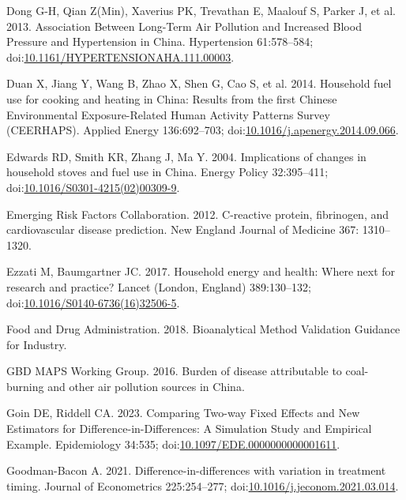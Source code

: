 \documentclass[
  letterpaper,
  DIV=11,
  numbers=noendperiod]{scrartcl}
\newlength{\cslhangindent}
\newenvironment{CSLReferences}[2] %
 {\begin{list}{}{%
  \setlength{\itemindent}{0pt}
  \setlength{\leftmargin}{0pt}
  \setlength{\parsep}{0pt}
  \ifodd #1
   \setlength{\leftmargin}{\cslhangindent}
   \setlength{\itemindent}{-1\cslhangindent}
  \fi
  \setlength{\itemsep}{#2\baselineskip}}}
 {\end{list}}
\begin{document}
\begin{CSLReferences}{1}{1}
Dong G-H, Qian Z(Min), Xaverius PK, Trevathan E, Maalouf S, Parker J, et
al. 2013. Association {Between Long-Term Air Pollution} and {Increased
Blood Pressure} and {Hypertension} in {China}. Hypertension 61:578--584;
doi:\href{https://doi.org/10.1161/HYPERTENSIONAHA.111.00003}{10.1161/HYPERTENSIONAHA.111.00003}.

Duan X, Jiang Y, Wang B, Zhao X, Shen G, Cao S, et al. 2014. Household
fuel use for cooking and heating in {China}: {Results} from the first
{Chinese Environmental Exposure-Related Human Activity Patterns Survey}
({CEERHAPS}). Applied Energy 136:692--703;
doi:\href{https://doi.org/10.1016/j.apenergy.2014.09.066}{10.1016/j.apenergy.2014.09.066}.

Edwards RD, Smith KR, Zhang J, Ma Y. 2004. Implications of changes in
household stoves and fuel use in {China}. Energy Policy 32:395--411;
doi:\href{https://doi.org/10.1016/S0301-4215(02)00309-9}{10.1016/S0301-4215(02)00309-9}.

Emerging Risk Factors Collaboration. 2012. C-reactive protein,
fibrinogen, and cardiovascular disease prediction. New England Journal
of Medicine 367: 1310--1320.

Ezzati M, Baumgartner JC. 2017. Household energy and health: Where next
for research and practice? Lancet (London, England) 389:130--132;
doi:\href{https://doi.org/10.1016/S0140-6736(16)32506-5}{10.1016/S0140-6736(16)32506-5}.

Food and Drug Administration. 2018. Bioanalytical {Method Validation
Guidance} for {Industry}.

GBD MAPS Working Group. 2016. Burden of disease attributable to
coal-burning and other air pollution sources in {China}.

Goin DE, Riddell CA. 2023. Comparing {Two-way Fixed Effects} and {New
Estimators} for {Difference-in-Differences}: {A Simulation Study} and
{Empirical Example}. Epidemiology 34:535;
doi:\href{https://doi.org/10.1097/EDE.0000000000001611}{10.1097/EDE.0000000000001611}.

Goodman-Bacon A. 2021. Difference-in-differences with variation in
treatment timing. Journal of Econometrics 225:254--277;
doi:\href{https://doi.org/10.1016/j.jeconom.2021.03.014}{10.1016/j.jeconom.2021.03.014}.


\end{CSLReferences}
\end{document}
